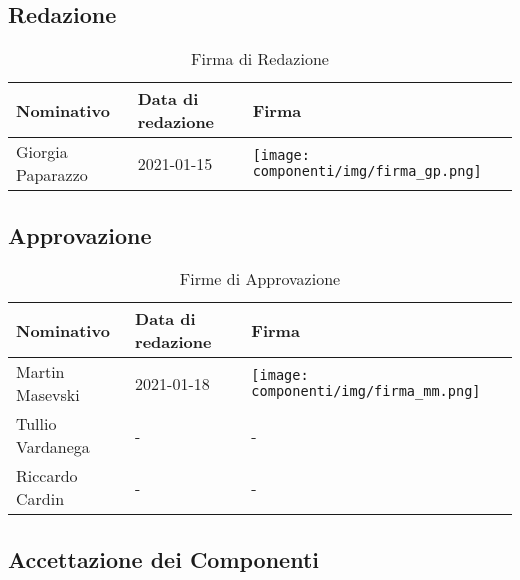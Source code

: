 \documentclass[../piano_di_progetto.tex]{subfiles}
\begin{document}
\subsection{Redazione}%
\label{sub:red}

\begin{table}[!ht]
	\centering
	\begin{tabular}{|l|l|l|}
		\hline
		\rowcolor{lightgray}
		\textbf{Nominativo} & \textbf{Data di redazione} & \textbf{Firma} \\ 
		\hline
			Giorgia Paparazzo & 2021-01-15 & \texttt{[image: componenti/img/firma\_gp.png]} \\
		\hline
	\end{tabular}
	\caption{Firma di Redazione}
\end{table}


\subsection{Approvazione}%
\label{sub:app}

\begin{table}[!ht]
	\centering
	\begin{tabular}{|l|l|l|}
		\hline
		\rowcolor{lightgray}
		\textbf{Nominativo} & \textbf{Data di redazione} & \textbf{Firma} \\ 

		\hline
			Martin Masevski & 2021-01-18 & \texttt{[image: componenti/img/firma\_mm.png]} \\ 
		\hline
			Tullio Vardanega & - & - \\
		\hline
			Riccardo Cardin  & - & - \\
		\hline
	\end{tabular}
		\caption{Firme di Approvazione}
\end{table}


\newpage
\subsection{Accettazione dei Componenti}%
\label{sub:acc_comp}
\end{document}
